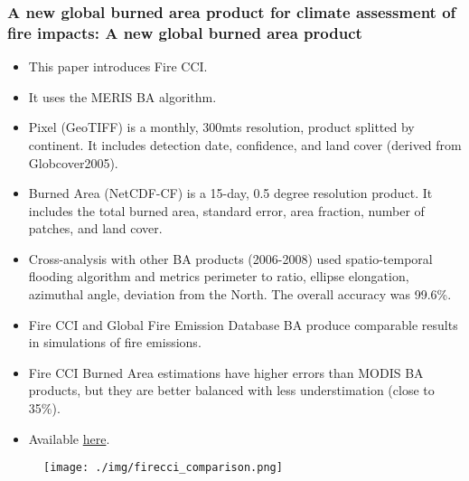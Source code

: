 \documentclass{beamer}
\begin{document}
\begin{frame}[t, allowframebreaks]
    \frametitle{A new global burned area product for climate assessment of fire 
    impacts: A new global burned area product~\cite{chuvieco2016}}
    \begin{itemize}
        \item This paper introduces Fire CCI.
        \item It uses the MERIS BA algorithm.
        \item Pixel (GeoTIFF) is a monthly, 300mts resolution, product 
            splitted by continent. It includes detection date, confidence, and 
            land cover (derived from Globcover2005).
        \item Burned Area (NetCDF-CF) is a 15-day, 0.5 degree resolution 
            product. It includes the total burned area, standard error, area 
            fraction, number of patches, and land cover.
        \item Cross-analysis with other BA products (2006-2008) used 
            spatio-temporal flooding algorithm and metrics perimeter to ratio, 
            ellipse elongation, azimuthal angle, deviation from the North. The
            overall accuracy was 99.6\%.
        \item Fire CCI and Global Fire Emission Database BA produce comparable 
            results in simulations of fire emissions.
        \item Fire CCI Burned Area estimations have higher errors than MODIS BA
            products, but they are better balanced with less understimation 
            (close to 35\%).
        \item Available \href{https://climate.esa.int/de/projects/fire/}{here}.
    \end{itemize}
    \begin{figure}
        \centering
        \texttt{[image: ./img/firecci\_comparison.png]}
    \end{figure}
\end{frame}
\end{document}
